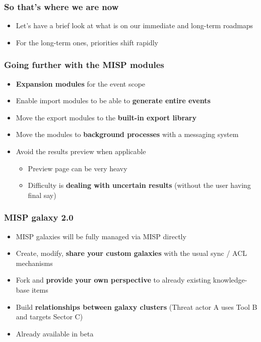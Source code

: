 \begin{frame}
\frametitle{So that's where we are now}
\begin{itemize}
	\item Let's have a brief look at what is on our immediate and long-term roadmaps
        \item For the long-term ones, priorities shift rapidly
\end{itemize}
\end{frame}

\begin{frame}
\frametitle{Going further with the MISP modules}
\begin{itemize}
    \item {\bf Expansion modules} for the event scope
    \item Enable import modules to be able to {\bf generate entire events}
    \item Move the export modules to the {\bf built-in export library}
\end{itemize}
\begin{itemize}
    \item Move the modules to {\bf background processes} with a
messaging system
    \item Avoid the results preview when applicable
    \begin{itemize}
        \item Preview page can be very heavy
        \item Difficulty is {\bf dealing with uncertain results} (without the user
having final say)
    \end{itemize}
\end{itemize}
\end{frame}

\begin{frame}
\frametitle{MISP galaxy 2.0}
\begin{itemize}
	\item MISP galaxies will be fully managed via MISP directly
        \item Create, modify, {\bf share your custom galaxies} with the usual sync / ACL mechanisms
        \item Fork and {\bf provide your own perspective} to already existing knowledge-base items
        \item Build {\bf relationships between galaxy clusters} (Threat actor A uses Tool B and targets Sector C)
        \item Already available in beta
\end{itemize}
\end{frame}


